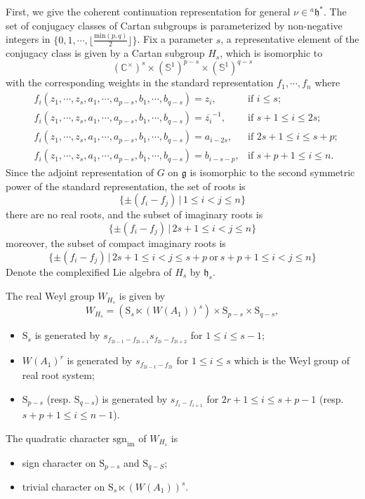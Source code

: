 \documentclass[12pt, a4paper]{amsart}
\numberwithin{equation}{section}
\newcommand{\BC}{{\mathbb {C}}}
\newcommand{\BS}{{\mathbb {S}}}
\newcommand{\fg}{\mathfrak{g}}
\newcommand{\fh}{\mathfrak{h}}
\newcommand{\sgn}{{\mathrm{sgn}}}
\newcommand{\set}[2]{\{#1\,|\,#2\}}
\renewcommand{\bar}{\overline}
\begin{document}
First, we give the coherent continuation representation for general $\nu \in {^{a}\fh^*}$. The set of conjugacy classes of Cartan subgroups is parameterized by non-negative integers in $\{0,1,\cdots,\lfloor\frac{\mathrm{min}(p,q)}{2}\rfloor\}$. Fix a parameter $s$, a representative element of the conjugacy class is given by a Cartan subgroup $H_s$, which is isomorphic to 
$$(\BC^{\times})^s \times (\BS^1)^{p-s} \times (\BS^1)^{q-s}$$
with the corresponding weights in the standard representation $f_1,\cdots ,f_n$ where
\begin{align}
    & f_{i}(z_1,\cdots,z_s,a_1,\cdots,a_{p-s},b_1,\cdots,b_{q-s}) = z_i, & \textrm{if $i \leq s$};\\
    & f_{i}(z_1,\cdots,z_s,a_1,\cdots,a_{p-s},b_1,\cdots,b_{q-s}) = \bar{z_i}^{-1}, & \textrm{if $s+1 \leq i \leq 2s$};\\
    &f_i(z_1,\cdots,z_s,a_1,\cdots,a_{p-s},b_1,\cdots,b_{q-s}) = a_{i-2s}, & \textrm{if $2s+1 \leq i \leq s+p$};\\
    &f_i(z_1,\cdots,z_s,a_1,\cdots,a_{p-s},b_1,\cdots,b_{q-s}) = b_{i-s-p}, & \textrm{if $s+p+1 \leq i \leq n$}.
\end{align}
Since the adjoint representation of $G$ on $\fg$ is isomorphic to the second symmetric power of the standard representation, the set of roots is 
$$\set{\pm(f_i-f_j)}{1\leq i <j \leq n}$$
there are no real roots, and the subset of imaginary roots is
$$\set{\pm(f_i-f_j)}{2s+1 \leq i < j \leq n}$$
moreover, the subset of compact imaginary roots is
$$\set{\pm(f_i-f_j)}{2s+1 \leq i < j \leq s+p \  \textrm{or} \ s+p+1 \leq i<j \leq n }$$
Denote the complexified Lie algebra of $H_s$ by $\fh_s$. 

The real Weyl group $W_{H_s}$ is given by
$$W_{H_s} = (\mathrm{S}_s \ltimes  (W(A_1))^s) \times \mathrm{S}_{p-s} \times \mathrm{S}_{q-s},$$

\begin{itemize}
    \item $\mathrm{S}_s$ is generated by $s_{f_{2i-1}-f_{2i+1}}s_{f_{2i}-f_{2i+2}}$ for $1 \leq i \leq s-1$;
    \item $W(A_1)^r$ is generated by $s_{f_{2i-1}-f_{2i}}$ for $1 \leq i \leq s$ which is the Weyl group of real root system;
    \item $\mathrm{S}_{p-s}$ (resp. $\mathrm{S}_{q-s}$) is generated by $s_{f_{i}-f_{i+1}}$ for $2r+1 \leq i \leq s+p-1$ (resp. $s+p+1 \leq i \leq n-1$).
\end{itemize}

The quadratic character $\sgn_{\mathrm{im}}$ of $W_{H_{s}}$ is
\begin{itemize}
    \item sign character on $\mathrm{S}_{p-s}$ and $\mathrm{S}_{q-S}$;
    \item trivial character on $\mathrm{S}_s \ltimes  (W(A_1))^s$.
\end{itemize}
\end{document}
